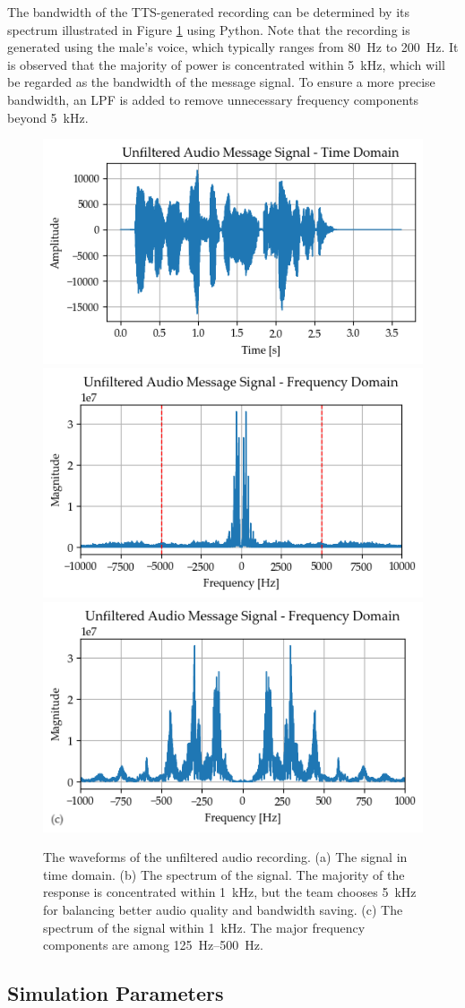 \documentclass[../ECE459FinalProjectReport.tex]{subfiles}
\begin{document}
The bandwidth of the TTS-generated recording can be determined by its spectrum illustrated in Figure \ref{fig:audio-original} using Python. Note that the recording is generated using the male's voice, which typically ranges from \SI{80}{Hz} to \SI{200}{\Hz}. It is observed that the majority of power is concentrated within \SI{5}{kHz}, which will be regarded as the bandwidth of the message signal. To ensure a more precise bandwidth, an LPF is added to remove unnecessary frequency components beyond \SI{5}{kHz}.
\begin{figure}[hb]
    \centering
    \includegraphics[width=0.49\linewidth]{plots/unfiltered_audio_time.png}
    \includegraphics[width=0.49\linewidth]{plots/unfiltered_audio_freq.png}
    \includegraphics[width=0.49\linewidth]{plots/audio_spectrum_1khz.png}
    \caption{The waveforms of the unfiltered audio recording. (a) The signal in time domain. (b) The spectrum of the signal. The majority of the response is concentrated within \SI{1}{kHz}, but the team chooses \SI{5}{kHz} for balancing better audio quality and bandwidth saving. (c) The spectrum of the signal within \SI{1}{kHz}. The major frequency components are among \qtyrange{125}{500}{Hz}.}
    \label{fig:audio-original}
\end{figure}

\subsection{Simulation Parameters}
\end{document}
